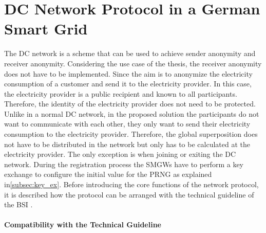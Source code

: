 \section{DC Network Protocol in a German Smart Grid}
The DC network is a scheme that can be used to achieve sender anonymity and receiver anonymity. Considering the use case of the thesis, the receiver anonymity does not have to be implemented. Since the aim is to anonymize the electricity consumption of a customer and send it to the electricity provider. In this case, the electricity provider is a public recipient and known to all participants. Therefore, the identity of the electricity provider does not need to be protected. Unlike in a normal DC network, in the proposed solution the participants do not want to communicate with each other, they only want to send their electricity consumption to the electricity provider. Therefore, the global superposition does not have to be distributed in the network but only has to be calculated at the electricity provider. The only exception is when joining or exiting the DC network.
During the registration process the SMGWs have to perform a key exchange to configure the initial value for the PRNG as explained in\ref{subsec:key_ex}. Before introducing the core functions of the network protocol, it is described how the protocol can be arranged with the technical guideline of the BSI \cite{TR-031}.\\
\\
\textbf{Compatibility with the Technical Guideline}
\\
\\
